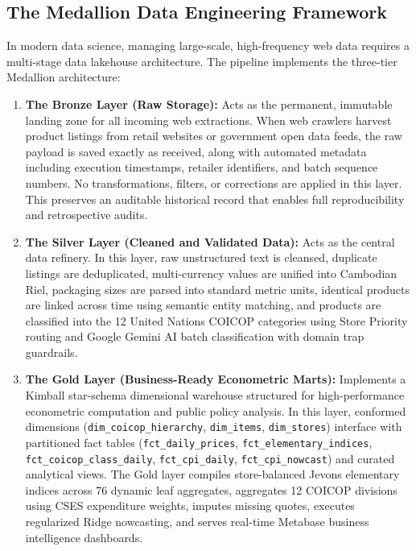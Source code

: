 \subsection{The Medallion Data Engineering Framework}
\hs In modern data science, managing large-scale, high-frequency web data requires a multi-stage data lakehouse architecture. The pipeline implements the three-tier Medallion architecture:
\begin{enumerate}
    \item \textbf{The Bronze Layer (Raw Storage):} Acts as the permanent, immutable landing zone for all incoming web extractions. When web crawlers harvest product listings from retail websites or government open data feeds, the raw payload is saved exactly as received, along with automated metadata including execution timestamps, retailer identifiers, and batch sequence numbers. No transformations, filters, or corrections are applied in this layer. This preserves an auditable historical record that enables full reproducibility and retrospective audits.
    \item \textbf{The Silver Layer (Cleaned and Validated Data):} Acts as the central data refinery. In this layer, raw unstructured text is cleansed, duplicate listings are deduplicated, multi-currency values are unified into Cambodian Riel, packaging sizes are parsed into standard metric units, identical products are linked across time using semantic entity matching, and products are classified into the 12 United Nations COICOP categories using Store Priority routing and Google Gemini AI batch classification with domain trap guardrails.
    \item \textbf{The Gold Layer (Business-Ready Econometric Marts):} Implements a Kimball star-schema dimensional warehouse structured for high-performance econometric computation and public policy analysis. In this layer, conformed dimensions (\texttt{dim\_coicop\_hierarchy}, \texttt{dim\_items}, \texttt{dim\_stores}) interface with partitioned fact tables (\texttt{fct\_daily\_prices}, \texttt{fct\_elementary\_indices}, \texttt{fct\_coicop\_class\_daily}, \texttt{fct\_cpi\_daily}, \texttt{fct\_cpi\_nowcast}) and curated analytical views. The Gold layer compiles store-balanced Jevons elementary indices across 76 dynamic leaf aggregates, aggregates 12 COICOP divisions using CSES expenditure weights, imputes missing quotes, executes regularized Ridge nowcasting, and serves real-time Metabase business intelligence dashboards.
\end{enumerate}

